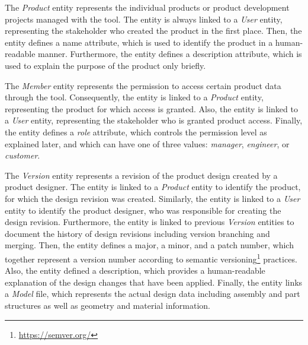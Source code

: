 The \textit{Product} entity represents the individual products or product development projects managed with the tool.
The entity is always linked to a \textit{User} entity, representing the stakeholder who created the product in the first place.
Then, the entity defines a name attribute, which is used to identify the product in a human-readable manner.
Furthermore, the entity defines a description attribute, which is used to explain the purpose of the product only briefly.

The \textit{Member} entity represents the permission to access certain product data through the tool.
Consequently, the entity is linked to a \textit{Product} entity, representing the product for which access is granted.
Also, the entity is linked to a \textit{User} entity, representing the stakeholder who is granted product access.
Finally, the entity defines a \textit{role} attribute, which controls the permission level as explained later, and which can have one of three values: \textit{manager}, \textit{engineer}, or \textit{customer}.

The \textit{Version} entity represents a revision of the product design created by a product designer.
The entity is linked to a \textit{Product} entity to identify the product, for which the design revision was created.
Similarly, the entity is linked to a \textit{User} entity to identify the product designer, who was responsible for creating the design revision.
Furthermore, the entity is linked to previous \textit{Version} entities to document the history of design revisions including version branching and merging.
Then, the entity defines a major, a minor, and a patch number, which together represent a version number according to semantic versioning\footnote{\url{https://semver.org/}} practices.
Also, the entity defined a description, which provides a human-readable explanation of the design changes that have been applied.
Finally, the entity links a \textit{Model} file, which represents the actual design data including assembly and part structures as well as geometry and material information.

